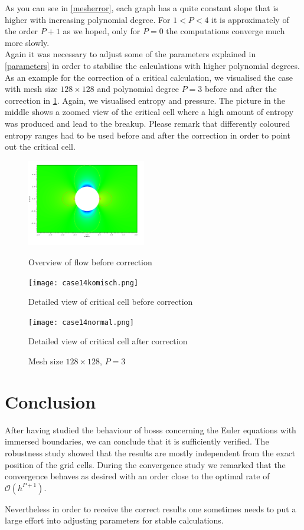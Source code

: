 	As you can see in \cref{mesherror}, each graph has a quite constant slope that is higher with increasing polynomial degree. For $1 < P < 4$ it is approximately of the order $P+1$ as we hoped, only for $P = 0$ the computations converge much more slowly.\\ \indent
	Again it was necessary to adjust some of the parameters explained in \cref{parameters} in order to stabilise the calculations with higher polynomial degrees. \\ \indent
	As an example for the correction of a critical calculation, we visualised the case with mesh size $128 \times 128$ and polynomial degree $P = 3$ before and after the correction in \cref{fig:case14}. Again, we visualised entropy and pressure. The picture in the middle shows a zoomed view of the critical cell where a high amount of entropy was produced and lead to the breakup. Please remark that differently coloured entropy ranges had to be used before and after the correction in order to point out the critical cell.
	\begin{figure}[htp]
		\centering
		\begin{minipage}[b]{0.3\textwidth}
			\centering
			\includegraphics[height=3.8cm]{img/case14.png}
			\caption*{Overview of flow before correction}
		\end{minipage}
		\quad
		\begin{minipage}[b]{0.3\textwidth}
			\centering
			\texttt{[image: case14komisch.png]}
			\caption*{Detailed view of critical cell before correction}
			\label{fig:case14detail}
		\end{minipage}
		\quad
		\begin{minipage}[b]{0.3\textwidth}
			\centering
			\texttt{[image: case14normal.png]}
			\caption*{Detailed view of critical cell after correction}
			\label{fig:case14detailneu}
		\end{minipage}
		\caption{Mesh size $128 \times 128$, $P = 3$}
		\label{fig:case14}
	\end{figure}
	
	\section{Conclusion}
	
	After having studied the behaviour of \gls{bosss} concerning the Euler equations with immersed boundaries, we can conclude that it is sufficiently verified. The robustness study showed that the results are mostly independent from the exact position of the grid cells. During the convergence study we remarked  that the convergence behaves as desired with an order close to the optimal rate of $\mathcal{O}(h^{P+1})$. 
	
	Nevertheless in order to receive the correct results one sometimes needs to put a large effort into adjusting parameters for stable calculations. 
